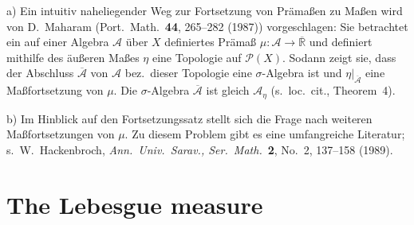 \documentclass[11pt, a4paper, openany]{book}
\theoremstyle{definition}
\begin{document}
    \begin{remark}[4.8]
        \textup{a)} Ein intuitiv naheliegender Weg zur Fortsetzung von Pr\"a\-ma{\ss}en zu Ma{\ss}en wird von D.~Maharam (Port.\ Math.\ \textbf{44}, 265--282 (1987)) vorgeschlagen:
        Sie betrachtet ein auf einer Algebra $\mathcal{A}$ \"uber $X$ definiertes Pr\"ama{\ss} $\mu : \mathcal{A} \to \overline{\mathbb{R}}$
        und definiert mithilfe des \"au{\ss}eren Ma{\ss}es $\eta$ eine Topologie auf $\mathcal{P}(X)$.
        Sodann zeigt sie, dass der Abschluss $\overline{\mathcal{A}}$ von $\mathcal{A}$ bez.\ dieser Topologie eine
        $\sigma$-Algebra ist und $\eta|_{\overline{\mathcal{A}}}$ eine Ma{\ss}fortsetzung von $\mu$.
        Die $\sigma$-Algebra $\overline{\mathcal{A}}$ ist gleich $\mathcal{A}_\eta$
        (s.\ loc.\ cit., Theorem~4).
        
        \medskip
        \textup{b)} Im Hinblick auf den Fortsetzungssatz stellt sich die Frage nach weiteren
        Ma{\ss}fortsetzungen von $\mu$. Zu diesem Problem gibt es eine umfangreiche Literatur;
        s.\ W.~Hackenbroch, \emph{Ann.\ Univ.\ Sarav., Ser.\ Math.}\ \textbf{2}, No.~2,
        137--158 (1989).
    \end{remark}
\section{The Lebesgue measure}
\end{document}
